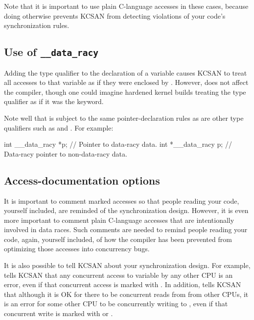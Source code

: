 Note that it is important to use plain C-language accesses in these cases,
because doing otherwise prevents KCSAN from detecting violations of your
code's synchronization rules.


\subsection{Use of \texttt{\_\_data\_racy}}

Adding the  type qualifier to the declaration of a variable
causes KCSAN to treat all accesses to that variable as if they were
enclosed by .
However,  does not affect the compiler, though one could
imagine hardened kernel builds treating the  type qualifier
as if it was the  keyword.

Note well that  is subject to the same pointer-declaration
rules as are other type qualifiers such as  and .
For example:

\begin{VerbatimU}
	int __data_racy *p; // Pointer to data-racy data.
	int *__data_racy p; // Data-racy pointer to non-data-racy data.
\end{VerbatimU}

\subsection{Access-documentation options}

It is important to comment marked accesses so that people reading your
code, yourself included, are reminded of the synchronization design.
However, it is even more important to comment plain C-language accesses
that are intentionally involved in data races.
Such comments are needed to remind people reading your code, again,
yourself included, of how the compiler has been prevented from optimizing
those accesses into concurrency bugs.

It is also possible to tell KCSAN about your synchronization design.
For example,  tells KCSAN that any
concurrent access to variable  by any other CPU is an error, even
if that concurrent access is marked with .
In addition,  tells KCSAN that although
it is OK for there to be concurrent reads from  from other CPUs,
it is an error for some other CPU to be concurrently writing to ,
even if that concurrent write is marked with  or
.

